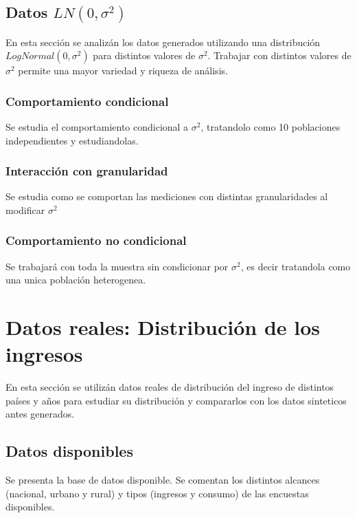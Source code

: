 \documentclass[11pt,a4paper]{tesis}
\begin{document}
\section{Datos $LN(0,\sigma^2)$}

En esta sección se analizán los datos generados utilizando una distribución $LogNormal(0,\sigma^2)$ para distintos valores de $\sigma^2$. Trabajar con distintos valores de $\sigma^2$ permite una mayor variedad y riqueza de análisis.

\subsection{Comportamiento condicional}

Se estudia el comportamiento condicional a $\sigma^2$, tratandolo como 10 poblaciones independientes y estudiandolas.

\subsection{Interacción con granularidad}

Se estudia como se comportan las mediciones con distintas granularidades al modificar $\sigma^2$

\subsection{Comportamiento no condicional}

Se trabajará con toda la muestra sin condicionar por $\sigma^2$, es decir tratandola como una unica población heterogenea.

\chapter{Datos reales: Distribución de los ingresos}

En esta sección se utilizán datos reales de distribución del ingreso de distintos países y años para estudiar su distribución y compararlos con los datos sinteticos antes generados.

\section{Datos disponibles}

Se presenta la base de datos disponible. Se comentan los distintos alcances (nacional, urbano y rural) y tipos (ingresos y consumo) de las encuestas disponibles.
\end{document}

